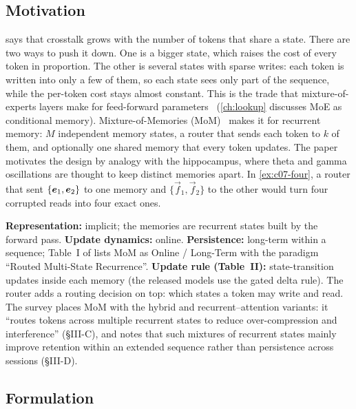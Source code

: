 \subsection{Motivation}

 says that crosstalk grows with the number of tokens that share a
state. There are two ways to push it down. One is a bigger state, which raises the cost of
every token in proportion. The other is several states with sparse writes: each token is
written into only a few of them, so each state sees only part of the sequence, while the
per-token cost stays almost constant. This is the trade that mixture-of-experts layers make
for feed-forward parameters~\citep{c01-shazeer2017moe,fedus2022switch} (\cref{ch:lookup}
discusses MoE as conditional memory). Mixture-of-Memories (MoM)~\citep{du2025mom} makes it for
recurrent memory: $M$ independent memory states, a router that sends each token to $k$ of
them, and optionally one shared memory that every token updates. The paper motivates the
design by analogy with the hippocampus, where theta and gamma oscillations are thought to
keep distinct memories apart. In \cref{ex:c07-four}, a router that sent $\{\bm{e}_1,\bm{e}_2\}$ to
one memory and $\{\vec f_1,\vec f_2\}$ to the other would turn four corrupted reads into four
exact ones.

\begin{taxonomy}
\textbf{Representation:} implicit; the memories are recurrent states built by the forward pass.
\textbf{Update dynamics:} online.
\textbf{Persistence:} long-term within a sequence; Table~I of \citet{zhoubian2026memory} lists
MoM as Online / Long-Term with the paradigm ``Routed Multi-State Recurrence''.
\textbf{Update rule (Table~II):} state-transition updates inside each memory (the released
models use the gated delta rule). The router adds a routing decision on top: which states a
token may write and read. The survey places MoM with the hybrid and recurrent--attention
variants: it ``routes tokens across multiple recurrent states to reduce over-compression
and interference'' (\S III-C), and notes that such mixtures of recurrent states mainly improve
retention within an extended sequence rather than persistence across sessions (\S III-D).
\end{taxonomy}

\subsection{Formulation}\label{sec:c07-mom-formulation}


